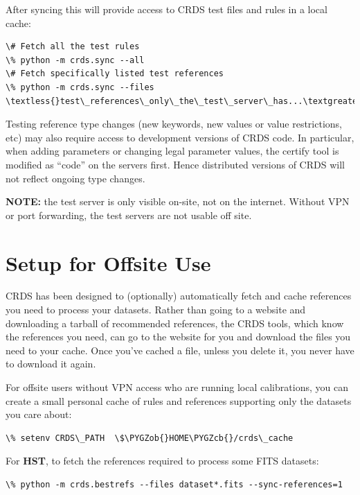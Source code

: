 \documentclass[letterpaper,10pt,english]{sphinxmanual}
\def\PYGZob{\char`\{}
\def\PYGZcb{\char`\}}
\begin{document}
After syncing this will provide access to CRDS test files and rules in a local cache:

\begin{Verbatim}[commandchars=\\\{\}]
\# Fetch all the test rules
\% python -m crds.sync --all
\# Fetch specifically listed test references
\% python -m crds.sync --files \textless{}test\_references\_only\_the\_test\_server\_has...\textgreater{}
\end{Verbatim}

Testing reference type changes (new keywords,  new values or value restrictions, etc) may also require access to
development versions of CRDS code.   In particular,  when adding parameters or changing legal parameter values,
the certify tool is modified as ``code'' on the servers first.   Hence distributed versions of CRDS will not reflect
ongoing type changes.

\textbf{NOTE:} the test server is only visible on-site,  not on the internet.  Without VPN or port forwarding,  the test
servers are not usable off site.


\section{Setup for Offsite Use}
\label{installation:setup-for-offsite-use}
CRDS has been designed to (optionally) automatically fetch and cache references you need to process your datasets.
Rather than going to a website and downloading a tarball of recommended references,  the CRDS tools,  which know
the references you need,  can go to the website for you and download the files you need to your cache.  Once you've
cached a file,  unless you delete it,  you never have to download it again.

For offsite users without VPN access who are running local calibrations,  you can create a small personal
cache of rules and references supporting only the datasets you care about:

\begin{Verbatim}[commandchars=\\\{\}]
\% setenv CRDS\_PATH  \$\PYGZob{}HOME\PYGZcb{}/crds\_cache
\end{Verbatim}

For \textbf{HST}, to fetch the references required to process some FITS datasets:

\begin{Verbatim}[commandchars=\\\{\}]
\% python -m crds.bestrefs --files dataset*.fits --sync-references=1
\end{Verbatim}
\end{document}
